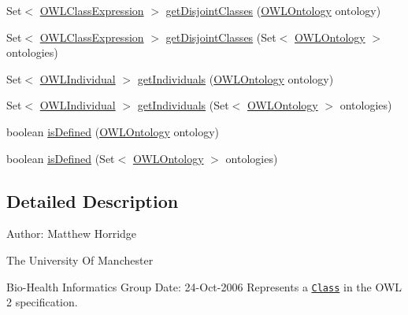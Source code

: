 \begin{DoxyCompactItemize}
\item 
Set$<$ \hyperlink{interfaceorg_1_1semanticweb_1_1owlapi_1_1model_1_1_o_w_l_class_expression}{O\-W\-L\-Class\-Expression} $>$ \hyperlink{interfaceorg_1_1semanticweb_1_1owlapi_1_1model_1_1_o_w_l_class_a74ff6ffdb53597ae3a55c3ff717355ec}{get\-Disjoint\-Classes} (\hyperlink{interfaceorg_1_1semanticweb_1_1owlapi_1_1model_1_1_o_w_l_ontology}{O\-W\-L\-Ontology} ontology)
\item 
Set$<$ \hyperlink{interfaceorg_1_1semanticweb_1_1owlapi_1_1model_1_1_o_w_l_class_expression}{O\-W\-L\-Class\-Expression} $>$ \hyperlink{interfaceorg_1_1semanticweb_1_1owlapi_1_1model_1_1_o_w_l_class_af1fb528c520e5d94052f8c226a419f6d}{get\-Disjoint\-Classes} (Set$<$ \hyperlink{interfaceorg_1_1semanticweb_1_1owlapi_1_1model_1_1_o_w_l_ontology}{O\-W\-L\-Ontology} $>$ ontologies)
\item 
Set$<$ \hyperlink{interfaceorg_1_1semanticweb_1_1owlapi_1_1model_1_1_o_w_l_individual}{O\-W\-L\-Individual} $>$ \hyperlink{interfaceorg_1_1semanticweb_1_1owlapi_1_1model_1_1_o_w_l_class_ac69d383fb6f971fd006c731946a5ada3}{get\-Individuals} (\hyperlink{interfaceorg_1_1semanticweb_1_1owlapi_1_1model_1_1_o_w_l_ontology}{O\-W\-L\-Ontology} ontology)
\item 
Set$<$ \hyperlink{interfaceorg_1_1semanticweb_1_1owlapi_1_1model_1_1_o_w_l_individual}{O\-W\-L\-Individual} $>$ \hyperlink{interfaceorg_1_1semanticweb_1_1owlapi_1_1model_1_1_o_w_l_class_a4c97909381b8638a0305c3e614b00700}{get\-Individuals} (Set$<$ \hyperlink{interfaceorg_1_1semanticweb_1_1owlapi_1_1model_1_1_o_w_l_ontology}{O\-W\-L\-Ontology} $>$ ontologies)
\item 
boolean \hyperlink{interfaceorg_1_1semanticweb_1_1owlapi_1_1model_1_1_o_w_l_class_a5be0d5075a4db6307440c943ec8fd82a}{is\-Defined} (\hyperlink{interfaceorg_1_1semanticweb_1_1owlapi_1_1model_1_1_o_w_l_ontology}{O\-W\-L\-Ontology} ontology)
\item 
boolean \hyperlink{interfaceorg_1_1semanticweb_1_1owlapi_1_1model_1_1_o_w_l_class_a9e663690a8e159782eb13f1a41b83322}{is\-Defined} (Set$<$ \hyperlink{interfaceorg_1_1semanticweb_1_1owlapi_1_1model_1_1_o_w_l_ontology}{O\-W\-L\-Ontology} $>$ ontologies)
\end{DoxyCompactItemize}


\subsection{Detailed Description}
Author\-: Matthew Horridge\par
 The University Of Manchester\par
 Bio-\/\-Health Informatics Group Date\-: 24-\/\-Oct-\/2006 Represents a \href{http://www.w3.org/TR/2009/REC-owl2-syntax-20091027/#Classes}{\tt Class} in the O\-W\-L 2 specification. 

